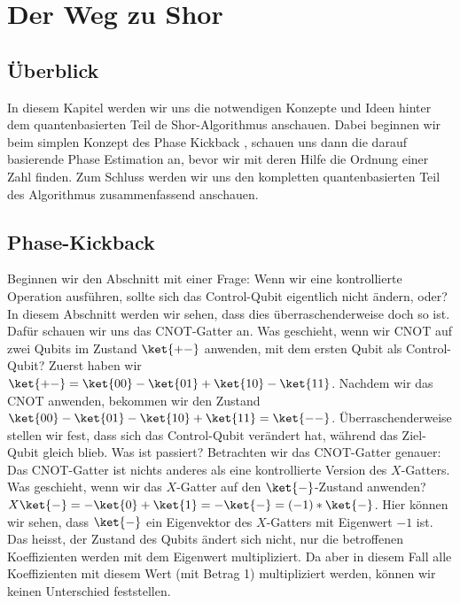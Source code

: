 \chapter{Der Weg zu Shor}
\section{Überblick}
In diesem Kapitel werden wir uns die notwendigen Konzepte und Ideen hinter dem quantenbasierten Teil de Shor-Algorithmus anschauen. Dabei beginnen wir beim simplen Konzept des \grqq Phase Kickback\grqq{} , schauen uns dann die darauf basierende \grqq Phase Estimation\grqq{} an, bevor wir mit deren Hilfe die Ordnung einer Zahl finden. Zum Schluss werden wir uns den kompletten quantenbasierten Teil des Algorithmus zusammenfassend anschauen.
\section{Phase-Kickback}
Beginnen wir den Abschnitt mit einer Frage: Wenn wir eine kontrollierte Operation ausführen, sollte sich das Control-Qubit eigentlich nicht ändern, oder? In diesem Abschnitt werden wir sehen, dass dies überraschenderweise doch so ist. Dafür schauen wir uns das CNOT-Gatter an. Was geschieht, wenn wir CNOT auf zwei Qubits im Zustand $\ket{+-}$ anwenden, mit dem ersten Qubit als Control-Qubit? Zuerst haben wir $\ket{+-} = \ket{00} - \ket{01} + \ket{10} - \ket{11}$. Nachdem wir das CNOT anwenden, bekommen wir den Zustand $\ket{00} - \ket{01} - \ket{10} + \ket{11} = \ket{--}$. Überraschenderweise stellen wir fest, dass sich das Control-Qubit verändert hat, während das Ziel-Qubit gleich blieb. Was ist passiert? Betrachten wir das CNOT-Gatter genauer: Das CNOT-Gatter ist nichts anderes als eine kontrollierte Version des $X$-Gatters. Was geschieht, wenn wir das $X$-Gatter auf den $\ket{-}$-Zustand anwenden? $X\ket{-} = -\ket{0} + \ket{1} = -\ket{-} = (-1)*\ket{-}$. Hier können wir sehen, dass $\ket{-}$ ein Eigenvektor des $X$-Gatters mit Eigenwert $-1$ ist. Das heisst, der Zustand des Qubits ändert sich nicht, nur die betroffenen Koeffizienten werden mit dem Eigenwert multipliziert. Da aber in diesem Fall alle Koeffizienten mit diesem Wert (mit Betrag 1) multipliziert werden, können wir keinen Unterschied feststellen.

